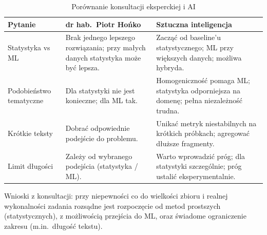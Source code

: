 \begin{table}[H]
\centering
\small
\begin{tabularx}{\textwidth}{|p{2.6cm}|X|X|}
\hline
\textbf{Pytanie} & \textbf{dr hab.\ Piotr Hońko} & \textbf{Sztuczna inteligencja} \\
\hline
Statystyka vs ML &
Brak jednego lepszego rozwiązania; przy małych danych statystyka może być lepsza. &
Zacząć od baseline'u statystycznego; ML przy większych danych; możliwa hybryda. \\
\hline
Podobieństwo tematyczne &
Dla statystyki nie jest konieczne; dla ML tak. &
Homogeniczność pomaga ML; statystyka odporniejsza na domenę; pełna niezależność trudna. \\
\hline
Krótkie teksty &
Dobrać odpowiednie podejście do problemu. &
Unikać metryk niestabilnych na krótkich próbkach; agregować dłuższe fragmenty. \\
\hline
Limit długości &
Zależy od wybranego podejścia (statystyka / ML). &
Warto wprowadzić próg; dla statystyki szczególnie; próg ustalić eksperymentalnie. \\
\hline
\end{tabularx}
\caption{Porównanie konsultacji eksperckiej i AI}
\end{table}

Wnioski z konsultacji: przy niepewności co do wielkości zbioru i realnej wykonalności zadania rozsądne jest rozpoczęcie od metod prostszych (statystycznych), z możliwością przejścia do ML, oraz świadome ograniczenie zakresu (m.in.\ długość tekstu).
